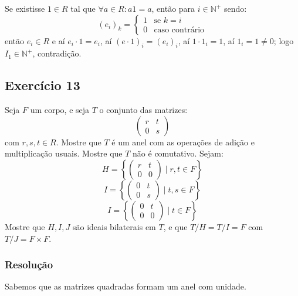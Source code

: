 \documentclass[10pt,a4paper]{article}
\begin{document}
\medskip
\noindent
Se existisse $1\in R$ tal que $\forall a\in R:a1=a$, então para $i\in\mathbb{N}^+$ sendo:
\[
(e_i)_k=\left\{\begin{array}{cl}
1&\text{se }k=i\\0&\text{caso contrário}
\end{array}\right.
\]
então $e_i\in R$ e aí $e_i\cdot 1=e_i$, aí $(e\cdot 1)_i=(e_i)_i$, aí $1\cdot 1_i=1$, aí $1_i=1\neq 0$; logo $I_1\in\mathbb{N}^+$, contradição.

\subsection*{Exercício 13}
Seja $F$ um corpo, e seja $T$ o conjunto das matrizes:
\[
\begin{pmatrix}
r&t\\0&s
\end{pmatrix}
\]
com $r,s,t\in R$. Mostre que $T$ é um anel com as operações de adição e multiplicação usuais. Mostre que $T$ não é comutativo. Sejam:
\[
H=\left\{\begin{pmatrix}
r&t\\0&0
\end{pmatrix}\mid r,t\in F\right\}
\]
\[
I=\left\{\begin{pmatrix}
0&t\\0&s
\end{pmatrix}\mid t,s\in F\right\}
\]
\[
I=\left\{\begin{pmatrix}
0&t\\0&0
\end{pmatrix}\mid t\in F\right\}
\]
Mostre que $H,I,J$ são ideais bilaterais em $T$, e que $T/H=T/I=F$ com $T/J=F\times F$.

\subsubsection*{Resolução}

Sabemos que as matrizes quadradas formam um anel com unidade.
\end{document}
